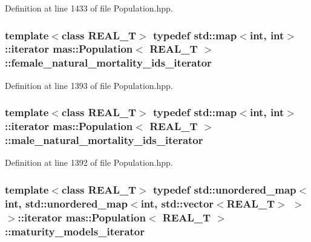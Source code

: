 Definition at line 1433 of file Population.\-hpp.

\hypertarget{classmas_1_1_population_a96fc8c402905ebb808d78ae6c61953c9}{
\subsubsection[{female\-\_\-natural\-\_\-mortality\-\_\-ids\-\_\-iterator}]{\setlength{\rightskip}{0pt plus 5cm}template$<$class R\-E\-A\-L\-\_\-\-T$>$ typedef std\-::map$<$int, int$>$\-::iterator {\bf mas\-::\-Population}$<$ R\-E\-A\-L\-\_\-\-T $>$\-::{\bf female\-\_\-natural\-\_\-mortality\-\_\-ids\-\_\-iterator}}}\label{classmas_1_1_population_a96fc8c402905ebb808d78ae6c61953c9}


Definition at line 1393 of file Population.\-hpp.

\hypertarget{classmas_1_1_population_aed3c87441d95effcc96071a1ac6ad69c}{
\subsubsection[{male\-\_\-natural\-\_\-mortality\-\_\-ids\-\_\-iterator}]{\setlength{\rightskip}{0pt plus 5cm}template$<$class R\-E\-A\-L\-\_\-\-T$>$ typedef std\-::map$<$int, int$>$\-::iterator {\bf mas\-::\-Population}$<$ R\-E\-A\-L\-\_\-\-T $>$\-::{\bf male\-\_\-natural\-\_\-mortality\-\_\-ids\-\_\-iterator}}}\label{classmas_1_1_population_aed3c87441d95effcc96071a1ac6ad69c}


Definition at line 1392 of file Population.\-hpp.

\hypertarget{classmas_1_1_population_ac63fa975ca5b6070604a82240a0d297b}{
\subsubsection[{maturity\-\_\-models\-\_\-iterator}]{\setlength{\rightskip}{0pt plus 5cm}template$<$class R\-E\-A\-L\-\_\-\-T$>$ typedef std\-::unordered\-\_\-map$<$int, std\-::unordered\-\_\-map$<$int, std\-::vector$<$R\-E\-A\-L\-\_\-\-T$>$ $>$ $>$\-::iterator {\bf mas\-::\-Population}$<$ R\-E\-A\-L\-\_\-\-T $>$\-::{\bf maturity\-\_\-models\-\_\-iterator}}}\label{classmas_1_1_population_ac63fa975ca5b6070604a82240a0d297b}


